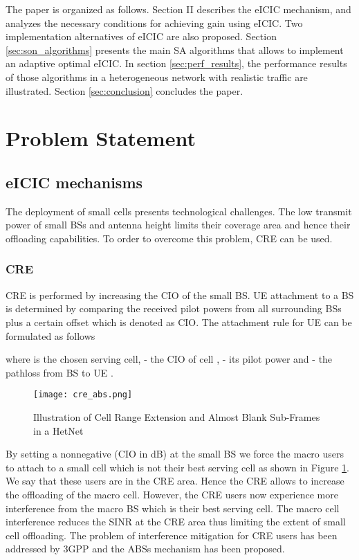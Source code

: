 \documentclass[conference]{IEEEtran}
\begin{document}
The paper is organized as follows. Section II describes the \ac{eICIC} mechanism, and analyzes the necessary conditions for achieving gain using \ac{eICIC}. Two implementation alternatives of \ac{eICIC} are also proposed. Section \ref{sec:son_algorithms} presents the main \ac{SA} algorithms that allows to implement an adaptive optimal \ac{eICIC}. In section \ref{sec:perf_results}, the performance results of those algorithms in a heterogeneous network with realistic traffic are illustrated. Section \ref{sec:conclusion} concludes the paper.


\section{Problem Statement}

\subsection{eICIC mechanisms}
	The deployment of small cells presents technological challenges. The low transmit power of small \acp{BS} and antenna height limits their coverage area and hence their offloading capabilities. To order to overcome this problem, \ac{CRE} can be used.

\subsubsection{\ac{CRE}}
	\ac{CRE} is performed by increasing the \ac{CIO} of the small \ac{BS}. \ac{UE} attachment to a \ac{BS} is determined by comparing the received pilot powers from all surrounding \acp{BS} plus a certain offset which is denoted as \acf{CIO}. The attachment rule for \ac{UE}  can be formulated as follows

where  is the chosen serving cell,  - the \ac{CIO} of cell ,  - its pilot power and  - the pathloss from \ac{BS}  to \ac{UE} .

\begin{figure}[!ht]
\centering
\texttt{[image: cre\_abs.png]}
\caption{Illustration of Cell Range Extension and Almost Blank Sub-Frames in a HetNet}
\label{fig:cre_abs}
\end{figure}

	By setting a nonnegative  (\ac{CIO} in dB) at the small \ac{BS} we force the macro users to attach to a small cell which is not their best serving cell as shown in Figure \ref{fig:cre_abs}. We say that these users are in the \ac{CRE} area. Hence the \ac{CRE} allows to increase the offloading of the macro cell. However, the \ac{CRE} users now experience more interference from the macro \ac{BS} which is their best serving cell. The macro cell interference reduces the \ac{SINR} at the \ac{CRE} area thus limiting the extent of small cell offloading. The problem of interference mitigation for \ac{CRE} users has been addressed by 3GPP and the \acp{ABS} mechanism has been proposed.  
\end{document}
